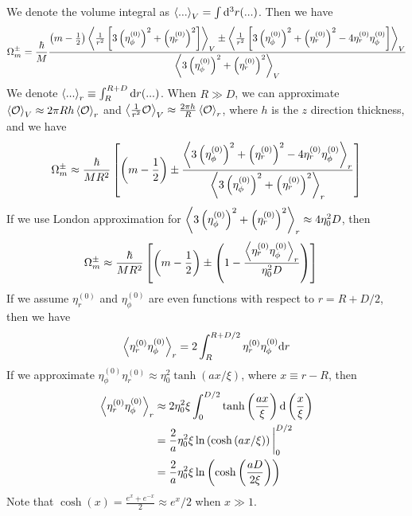 \documentclass[aps,prl,preprint]{revtex4-2}
\begin{document}
We denote the volume integral as $\ev{...}_V = \int\dd[3]r(...)$.
Then we have
\begin{align}
    \Omega_m^\pm = \frac{\hbar}{M}
    \frac{\left(m-\frac{1}{2}\right)\ev{\frac{1}{r^2}\left[3\left(\eta^{(0)}_\phi\right)^2 + \left(\eta^{(0)}_r\right)^2\right]}_V
    \pm \ev{\frac{1}{r^2}\left[3\left(\eta^{(0)}_\phi\right)^2 + \left(\eta^{(0)}_r\right)^2-4\eta^{(0)}_r\eta^{(0)}_\phi\right]}_V}
    {\ev{3\left(\eta^{(0)}_\phi\right)^2 + \left(\eta^{(0)}_r\right)^2}_V}\nonumber
\end{align}
We denote $\ev{...}_r \equiv \int_R^{R+D}\dd r(...)$.
When $R\gg D$, we can approximate $\ev{\mathcal{O}}_V\approx 2\pi Rh\ev{\mathcal{O}}_r$
and $\ev{\frac{1}{r^2}\mathcal{O}}_V\approx \frac{2\pi h}{R}\ev{\mathcal{O}}_r$,
where $h$ is the $z$ direction thickness, and we have
\begin{align}\label{omega_m_approx}
    \Omega_m^\pm \approx \frac{\hbar}{MR^2}
    \left[\left(m-\frac{1}{2}\right)\pm 
    \frac{\ev{3\left(\eta^{(0)}_\phi\right)^2 + \left(\eta^{(0)}_r\right)^2-4\eta^{(0)}_r\eta^{(0)}_\phi}_r}
    {\ev{3\left(\eta^{(0)}_\phi\right)^2 + \left(\eta^{(0)}_r\right)^2}_r}\right]
\end{align}
If we use London approximation for 
$\ev{3\left(\eta^{(0)}_\phi\right)^2 + \left(\eta^{(0)}_r\right)^2}_r\approx 4\eta_0^2D$,
then
\begin{align}
    \Omega_m^\pm &\approx \frac{\hbar}{MR^2}
    \left[\left(m-\frac{1}{2}\right)\pm 
    \left(1-\frac{\ev{\eta^{(0)}_r\eta^{(0)}_\phi}_r}{\eta_0^2D}\right)\right]
\end{align}
If we assume $\eta^{(0)}_r$ and $\eta^{(0)}_\phi$ are even functions
with respect to $r=R+D/2$, then we have
\begin{align}
    \ev{\eta^{(0)}_r\eta^{(0)}_\phi}_r = 2\int_R^{R+D/2}\eta^{(0)}_r\eta^{(0)}_\phi\dd r
\end{align}
If we approximate $\eta_\phi^{(0)}\eta_r^{(0)}\approx \eta_0^2\tanh(ax/\xi)$,
where $x \equiv r-R$, then
\begin{align}
    \ev{\eta^{(0)}_r\eta^{(0)}_\phi}_r 
    &\approx 2 \eta_0^2\xi
    \int_0^{D/2}
    \tanh\left(\frac{ax}{\xi}\right)
    \dd\left(\frac{x}{\xi}\right)\\
    &=\frac{2}{a}\eta_0^2\xi\ln\left(\cosh\left(ax/\xi\right)\right)\bigg|_0^{D/2}\\
    &=\frac{2}{a}\eta_0^2\xi\ln\left(\cosh\left(\frac{aD}{2\xi}\right)\right)
\end{align}
Note that $\cosh(x)=\frac{e^x+e^{-x}}{2}\approx e^x/2$ when $x\gg 1$.
\end{document}
